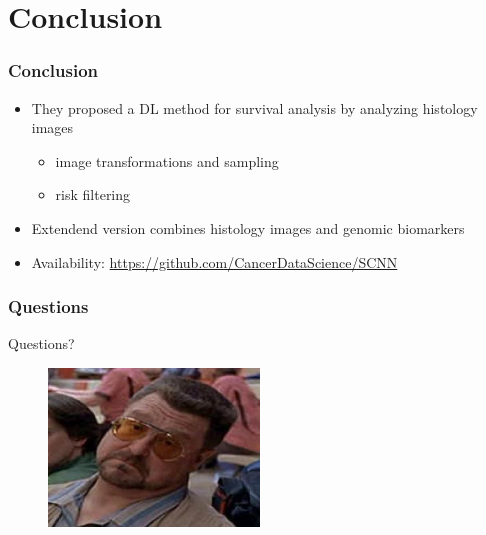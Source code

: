 \documentclass[usenames,dvipsnames]{beamer}
\begin{document}
\section{Conclusion}\label{sec:conclusion}
\begin{frame}
  \frametitle{Conclusion}
  \begin{itemize}
    \item They proposed a DL method for survival analysis by analyzing histology images
    \begin{itemize}
      \item image transformations and sampling
      \item risk filtering
    \end{itemize}
    \item Extendend version combines histology images and genomic biomarkers
    \item Availability: \url{https://github.com/CancerDataScience/SCNN}
  \end{itemize}
\end{frame}
\begin{frame}
  \frametitle{Questions}
  \begin{center}
    \Huge{Questions?}
  \end{center}
  \begin{figure}
    \centering
    \includegraphics[width=0.5\textwidth,keepaspectratio]{figures/walter.jpg}
  \end{figure}
\end{frame}
\end{document}
